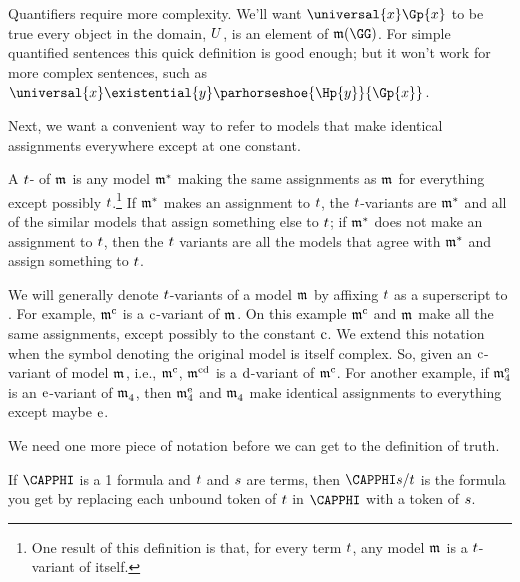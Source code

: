 Quantifiers require more complexity.   We'll want $\universal{\variable{x}}\Gp{\variable{x}}$ to be true \Iff every object in the domain, $U$, is an element of $\IntA(\GG)$.  For simple quantified sentences this quick definition is good enough; but it won't work for more complex sentences, such as $\universal{\variable{x}}\existential{\variable{y}}\parhorseshoe{\Hp{\variable{y}}}{\Gp{\variable{x}}}$.

Next, we want a convenient way to refer to models that make identical assignments everywhere except at one constant.

\begin{majorILnc}{}
A $t$- of $\As{}{}$ is any model $\mathfrak{m^{\mathrm{*}}_{\mathrm{}}}$ making the same assignments as $\As{}{}$ for everything except possibly $t$.\footnote{One result of this definition is that, for every term $t$, any model $\As{}{}$ is a $t$-variant of itself.}  If $\mathfrak{m^{\mathrm{*}}_{\mathrm{}}}$ makes an assignment to $t$, the $t$-variants are $\mathfrak{m^{\mathrm{*}}_{\mathrm{}}}$ and all of the similar models that assign something else to $t$;  if $\mathfrak{m^{\mathrm{*}}_{\mathrm{}}}$ does not make an assignment to $t$, then the $t$ variants are all the models that agree with $\mathfrak{m^{\mathrm{*}}_{\mathrm{}}}$ and assign something to $t$.
\end{majorILnc}
\noindent{}We will generally denote $t$-variants of a model $\As{}{}$ by affixing $t$ as a superscript to \mention{$\As{}{}$}. For example, $\mathfrak{m^{\mathrm{\mathrm{c}}}_{\mathrm{}}}$ is a $\mathrm{c}$-variant of $\As{}{}$.  On this example $\mathfrak{m^{\mathrm{\mathrm{c}}}_{\mathrm{}}}$ and $\As{}{}$ make all the same assignments, except possibly to the constant $\mathrm{c}$.
We extend this notation when the symbol denoting the original model is itself complex.
So, given an $\mathrm{c}$-variant of model $\As{}{}$, i.e., $\mathfrak{m^{\mathrm{\mathrm{c}}}_{\mathrm{}}}$, $\mathfrak{m^{\mathrm{\mathrm{cd}}}_{\mathrm{}}}$ is a $\mathrm{d}$-variant of $\mathfrak{m^{\mathrm{\mathrm{c}}}_{\mathrm{}}}$.  For another example, if $\mathfrak{m^{\mathrm{\mathrm{e}}}_{\mathrm{4}}}$ is an $\mathrm{e}$-variant of $\mathfrak{m^{\mathrm{}}_{\mathrm{4}}}$, then $\mathfrak{m^{\mathrm{\mathrm{e}}}_{\mathrm{4}}}$ and $\mathfrak{m^{\mathrm{}}_{\mathrm{4}}}$ make identical assignments to everything except maybe $\mathrm{e}$. 

We need one more piece of notation before we can get to the definition of truth.
\begin{majorILnc}{}
	If $\CAPPHI$ is a \GQL{}1 formula and $t$ and $s$ are terms, then $\CAPPHI\variable{s}/\variable{t}$ is the formula you get by replacing each unbound token of $t$ in $\CAPPHI$ with a token of $s$.
\end{majorILnc}

